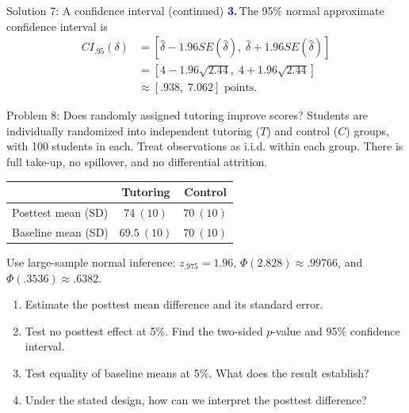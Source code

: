\documentclass[notes,10pt, aspectratio=169]{beamer}
\newcommand{\answerpart}[1]{\textcolor{blue}{\textbf{#1.}}\,}
\begin{document}
\begin{frame}{Solution 7: A confidence interval (continued)}
\small
\answerpart{3}The 95\% normal approximate confidence interval is
\begin{align*}
CI_{.95}(\delta)
&=[\widehat\delta-1.96SE(\widehat\delta),\;
\widehat\delta+1.96SE(\widehat\delta)]\\
&=[4-1.96\sqrt{2.44},\;4+1.96\sqrt{2.44}]\\
&\approx\boxed{[.938,\;7.062]}\text{ points}.
\end{align*}
\end{frame}
\fi

\begin{frame}{Problem 8: Does randomly assigned tutoring improve scores?}
Students are individually randomized into independent tutoring ($T$) and control ($C$) groups, with 100 students in each. Treat observations as i.i.d. within each group. There is full take-up, no spillover, and no differential attrition.
\begin{center}
\begin{tabular}{lcc}
\toprule
 & Tutoring & Control \\
\midrule
Posttest mean (SD) & $74\ (10)$ & $70\ (10)$ \\
Baseline mean (SD) & $69.5\ (10)$ & $70\ (10)$ \\
\bottomrule
\end{tabular}
\end{center}
Use large-sample normal inference: $z_{.975}=1.96$, $\Phi(2.828)\approx.99766$, and $\Phi(.3536)\approx.6382$.
\begin{enumerate}
\setlength{\itemsep}{4pt}
\item Estimate the posttest mean difference and its standard error.
\item Test no posttest effect at 5\%. Find the two-sided $p$-value and 95\% confidence interval.
\item Test equality of baseline means at 5\%. What does the result establish?
\item Under the stated design, how can we interpret the posttest difference?
\end{enumerate}
\end{frame}
\end{document}
